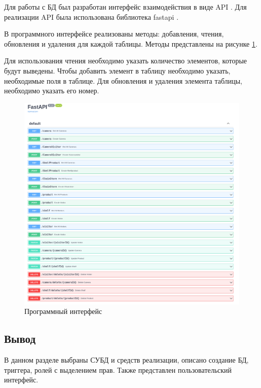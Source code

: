 Для работы с БД был разработан интерфейс взаимодействия в виде API \cite{API}.
Для реализации API была использована библиотека fastapi \cite{fastapi}.

В программного интерфейсе реализованы методы: добавления, чтения, обновления и
удаления для каждой таблицы.
Методы представлены на рисунке \ref{fig:api}.

Для использования чтения необходимо указать количество элементов, которые будут
выведены.
Чтобы добавить элемент в таблицу необходимо указать, необходимые поля в
таблице.
Для обновления и удаления элемента таблицы, необходимо указать его номер.

\begin{figure}[ht!]
    \centering
    \includegraphics[width=1\linewidth]{assets/images/api.png}
    \caption{Программный интерфейс}
    \label{fig:api}
\end{figure}
\FloatBarrier

\subsection*{Вывод}

В данном разделе выбраны СУБД и средств реализации, описано создание БД,
триггера, ролей с выделением прав.
Также представлен пользовательский интерфейс.